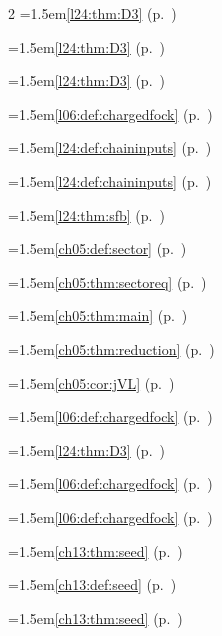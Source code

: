 \begin{multicols}{2}
\hangindent=1.5em\quad \ref{l24:thm:D3} (p.~\pageref{l24:thm:D3})\par
\hangindent=1.5em\quad \ref{l24:thm:D3} (p.~\pageref{l24:thm:D3})\par
\hangindent=1.5em\quad \ref{l24:thm:D3} (p.~\pageref{l24:thm:D3})\par
\hangindent=1.5em\quad \ref{l06:def:chargedfock} (p.~\pageref{l06:def:chargedfock})\par
\hangindent=1.5em\quad \ref{l24:def:chaininputs} (p.~\pageref{l24:def:chaininputs})\par
\hangindent=1.5em\quad \ref{l24:def:chaininputs} (p.~\pageref{l24:def:chaininputs})\par
\hangindent=1.5em\quad \ref{l24:thm:sfb} (p.~\pageref{l24:thm:sfb})\par
\hangindent=1.5em\quad \ref{ch05:def:sector} (p.~\pageref{ch05:def:sector})\par
\hangindent=1.5em\quad \ref{ch05:thm:sectoreq} (p.~\pageref{ch05:thm:sectoreq})\par
\hangindent=1.5em\quad \ref{ch05:thm:main} (p.~\pageref{ch05:thm:main})\par
\hangindent=1.5em\quad \ref{ch05:thm:reduction} (p.~\pageref{ch05:thm:reduction})\par
\hangindent=1.5em\quad \ref{ch05:cor:jVL} (p.~\pageref{ch05:cor:jVL})\par
\hangindent=1.5em\quad \ref{l06:def:chargedfock} (p.~\pageref{l06:def:chargedfock})\par
\hangindent=1.5em\quad \ref{l24:thm:D3} (p.~\pageref{l24:thm:D3})\par
\hangindent=1.5em\quad \ref{l06:def:chargedfock} (p.~\pageref{l06:def:chargedfock})\par
\hangindent=1.5em\quad \ref{l06:def:chargedfock} (p.~\pageref{l06:def:chargedfock})\par
\hangindent=1.5em\quad \ref{ch13:thm:seed} (p.~\pageref{ch13:thm:seed})\par
\hangindent=1.5em\quad \ref{ch13:def:seed} (p.~\pageref{ch13:def:seed})\par
\hangindent=1.5em\quad \ref{ch13:thm:seed} (p.~\pageref{ch13:thm:seed})\par

\end{multicols}
